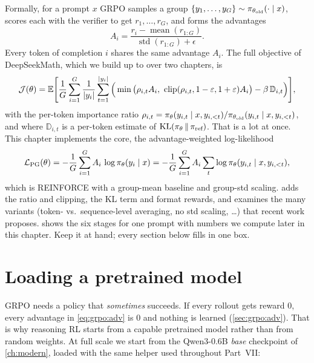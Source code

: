 Formally, for a prompt $x$ GRPO samples a group $\{y_1,\dots,y_G\}\sim\pi_{\theta_{\text{old}}}(\cdot\mid x)$,
scores each with the verifier to get $r_1,\dots,r_G$, and forms the advantages
\begin{equation}
A_i=\frac{r_i-\operatorname{mean}(r_{1:G})}{\operatorname{std}(r_{1:G})+\epsilon}.
\label{eq:grpo:adv}
\end{equation}
Every token of completion $i$ shares the same advantage $A_i$. The full objective of
DeepSeekMath, which we build up to over two chapters, is
\begin{equation}
\mathcal{J}(\theta)=\E\Bigg[\frac1G\sum_{i=1}^{G}\frac1{|y_i|}\sum_{t=1}^{|y_i|}
\Big(\min\big(\rho_{i,t}A_i,\ \clip(\rho_{i,t},1-\varepsilon,1+\varepsilon)A_i\big)
-\beta\,\mathbb{D}_{i,t}\Big)\Bigg],
\label{eq:grpo:full}
\end{equation}
with the per-token importance ratio
$\rho_{i,t}=\pi_\theta(y_{i,t}\mid x,y_{i,<t})/\pi_{\theta_{\text{old}}}(y_{i,t}\mid x,y_{i,<t})$, and where $\mathbb{D}_{i,t}$ is a per-token estimate of $\operatorname{KL}(\pi_\theta\,\|\,\pi_{\text{ref}})$. That is a
lot at once. This chapter implements the core, the advantage-weighted log-likelihood
\begin{equation}
\mathcal{L}_{\text{PG}}(\theta)=-\frac1G\sum_{i=1}^G A_i\,\log\pi_\theta(y_i\mid x)
 =-\frac1G\sum_{i=1}^G A_i\sum_{t}\log\pi_\theta(y_{i,t}\mid x,y_{i,<t}),
\label{eq:grpo:pg_loss}
\end{equation}
which is REINFORCE with a group-mean baseline and group-std scaling.  adds
the ratio and clipping, the KL term and format rewards, and examines the many variants
(token- vs.\ sequence-level averaging, no std scaling, \dots) that recent work proposes.
 shows the six stages for one prompt with numbers we compute later in
this chapter. Keep it at hand; every section below fills in one box.


\section{Loading a pretrained model}\label{sec:grpo:load}

GRPO needs a policy that \emph{sometimes} succeeds. If every rollout gets reward 0, every
advantage in \cref{eq:grpo:adv} is 0 and nothing is learned (\cref{sec:grpo:adv}). That is
why reasoning RL starts from a capable pretrained model rather than from random weights.
At full scale we start from the Qwen3-0.6B \emph{base} checkpoint of \cref{ch:modern},
loaded with the same helper used throughout Part~VII:


